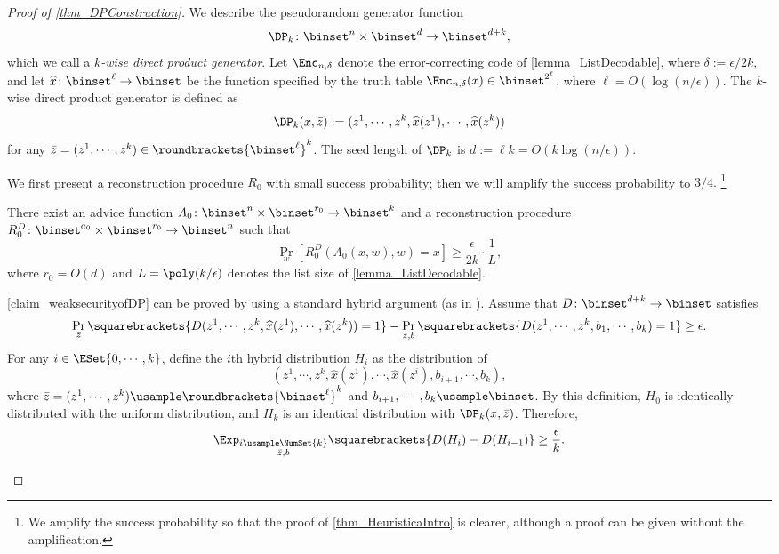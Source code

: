 \documentclass{toc}
\begin{document}
\begin{proof}
  [Proof of \cref{thm_DPConstruction}]
  We describe the pseudorandom generator function $$\DP_k \colon \binset^n \times \binset^d \to \binset^{d+k},$$
  which we call a \emph{$k$-wise direct product generator}.
  Let $\Enc_{n, \delta}$ denote the error-correcting code of \cref{lemma_ListDecodable},
  where $\delta := \epsilon / 2 k$,
  and let
  $\widehat{x} \colon \binset^{\ell} \to \binset$
  be
  the function specified by the truth table $\Enc_{n, \delta}(x) \in \binset^{2^{{\ell}}}$,
  where
  ${\ell} = O(\log (n / \epsilon))$.
  The $k$-wise direct product generator is defined as
  $$
    \DP_k(x, \bar{z}) := (z^1, \cdots, z^k, \widehat{x}(z^1), \cdots, \widehat{x}(z^k))
  $$
  for any $\bar{z} = (z^1, \cdots, z^k) \in \roundbrackets{\binset^{\ell}}^k$.
  The seed length of $\DP_k$ is $d := \ell k = O(k \log (n/\epsilon))$.

  We first present a reconstruction procedure $R_0$ with small success probability;
  then we will amplify the success probability to $3/4.$%
  \footnote{
    We amplify the success probability so that the proof of \cref{thm_HeuristicaIntro} is
    clearer,
    although
    a proof can be given without the amplification.
  }
  \begin{claim}
    \label{claim_weaksecurityofDP}
    There exist an advice function $A_0 \colon \binset^{n} \times \binset^{r_0} \to \binset^{k}$
    and
    a reconstruction procedure $R_0^D \colon \binset^{a_0} \times \binset^{r_0} \to \binset^n$
    such that
    $$
      \Pr_w [R_0^D(A_0(x, w), w) = x] \ge \frac{\epsilon}{2k} \cdot \frac{1}{L},
    $$
    where $r_0 = O(d)$ and $L = \poly(k/\epsilon)$ denotes the list size of \cref{lemma_ListDecodable}.
  \end{claim}

  \begin{claimproof}
    \cref{claim_weaksecurityofDP} can be proved by using a standard hybrid argument (as in \cite{NisanW94_jcss_journals,Vadhan12_fttcs_journals}).
    Assume that $D \colon \binset^{d+k} \to \binset$ satisfies
    $$
      \Pr_{\bar{z}} \squarebrackets{ D(z^1, \cdots, z^k, \widehat{x}(z^1), \cdots, \widehat{x}(z^k)) = 1 }
      -
      \Pr_{\bar{z}, b} \squarebrackets{ D(z^1, \cdots, z^k, b_1, \cdots, b_k) = 1 }
      \ge \epsilon.
    $$
    For any $i \in \ESet{0, \cdots, k}$,
    define the $i$th hybrid distribution $H_i$ as
    the distribution of
    $$(z^1, \cdots, z^k, \widehat{x}(z^1), \cdots, \widehat{x}(z^i), b_{i+1}, \cdots, b_k),$$
    where $\bar{z} = (z^1, \cdots, z^k) \usample \roundbrackets{ \binset^{\ell} }^k$
    and $b_{i+1}, \cdots, b_k \usample \binset$.
    By this definition, $H_0$ is identically distributed with the uniform distribution, and $H_k$ is an identical distribution with $\DP_k(x, \bar{z})$.
    Therefore,
    \[
      \Exp_{\substack{i \usample \NumSet{k} \\ \bar{z}, b}} \squarebrackets {
        D(H_i) - D(H_{i-1})
      }
      \ge \frac{\epsilon}{k}.
    \]


\end{claimproof}
\end{proof}
\end{document}
